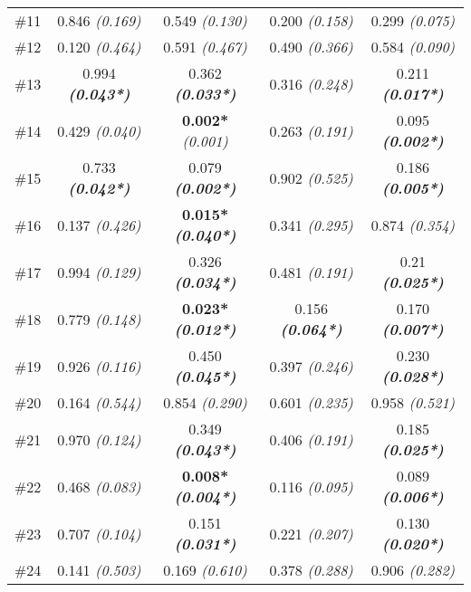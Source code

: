 \documentclass[twoside]{bhamthesis}
\theoremstyle{definition}
\begin{document}
\begin{table}[!ht]
\begin{center}
\begin{tabular}{|c| c c c c|}
\rule[-1ex]{0pt}{3.5ex}  \#11 & 0.846 \textit{(0.169)} & 0.549 \textit{(0.130)} & 0.200 \textit{(0.158)} & 0.299 \textit{(0.075)} \\
\rule[-1ex]{0pt}{3.5ex}  \#12 & 0.120 \textit{(0.464)} & 0.591 \textit{(0.467)} & 0.490 \textit{(0.366)} & 0.584 \textit{(0.090)} \\
\rule[-1ex]{0pt}{3.5ex}  \#13 & 0.994 \textbf{\textit{(0.043*)}} & 0.362 \textbf{\textit{(0.033*)}} & 0.316 \textit{(0.248)} & 0.211 \textbf{\textit{(0.017*)}} \\
\rule[-1ex]{0pt}{3.5ex}  \#14 & 0.429 \textit{(0.040)} & \textbf{0.002*} \textit{(0.001)} & 0.263 \textit{(0.191)} & 0.095 \textbf{\textit{(0.002*)}} \\ 
\rule[-1ex]{0pt}{3.5ex}  \#15 & 0.733 \textbf{\textit{(0.042*)}} & 0.079 \textbf{\textit{(0.002*)} }& 0.902 \textit{(0.525)} & 0.186 \textbf{\textit{(0.005*)}} \\
\rule[-1ex]{0pt}{3.5ex}  \#16 & 0.137 \textit{(0.426)} & \textbf{0.015*} \textbf{\textit{(0.040*)}} & 0.341 \textit{(0.295)} & 0.874 \textit{(0.354)} \\
\rule[-1ex]{0pt}{3.5ex}  \#17 & 0.994 \textit{(0.129)} & 0.326\textbf{ \textit{(0.034*)}} & 0.481 \textit{(0.191)} & 0.21 \textbf{\textit{(0.025*)}}\\
\rule[-1ex]{0pt}{3.5ex}  \#18 & 0.779 \textit{(0.148)} & \textbf{0.023*} \textbf{\textit{(0.012*)}} & 0.156  \textbf{\textit{(0.064*)}}& 0.170 \textbf{\textit{(0.007*)}} \\ 
\rule[-1ex]{0pt}{3.5ex}  \#19 & 0.926 \textit{(0.116)} & 0.450 \textbf{\textit{(0.045*)}} & 0.397 \textit{(0.246)} & 0.230 \textbf{\textit{(0.028*)}} \\
\rule[-1ex]{0pt}{3.5ex}  \#20 & 0.164 \textit{(0.544)} & 0.854 \textit{(0.290)} & 0.601 \textit{(0.235)} & 0.958 \textit{(0.521)} \\
\rule[-1ex]{0pt}{3.5ex}  \#21 & 0.970 \textit{(0.124)} & 0.349 \textbf{\textit{(0.043*)}} & 0.406 \textit{(0.191)} & 0.185 \textbf{\textit{(0.025*)} }\\
\rule[-1ex]{0pt}{3.5ex}  \#22 & 0.468 \textit{(0.083)} & \textbf{0.008*} \textbf{\textit{(0.004*)}} & 0.116 \textit{(0.095)} & 0.089 \textbf{\textit{(0.006*)}} \\ 
\rule[-1ex]{0pt}{3.5ex}  \#23 & 0.707 \textit{(0.104)} & 0.151 \textbf{\textit{(0.031*)}} & 0.221 \textit{(0.207)} & 0.130 \textbf{\textit{(0.020*)}} \\
\rule[-1ex]{0pt}{3.5ex}  \#24 & 0.141 \textit{(0.503)} & 0.169 \textit{(0.610)} & 0.378 \textit{(0.288)} & 0.906 \textit{(0.282)} \\

\end{tabular}
\end{center}
\end{table}
\end{document}
